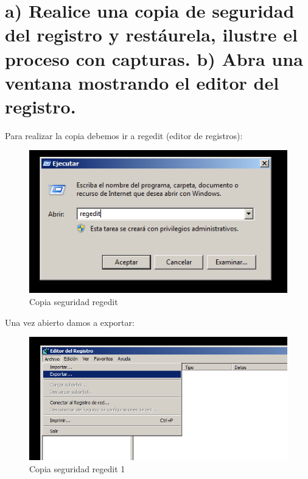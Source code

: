 \section[Cuestión 3]{a) Realice una copia de seguridad del registro y restáurela, ilustre el proceso con capturas. b) Abra una ventana mostrando el editor del	registro.}

Para realizar la copia debemos ir a regedit (editor de registros):

\begin{figure}[H] %
	\centering
	\includegraphics[scale=0.5]{pics/reg}  %
	\caption{Copia seguridad regedit} \label{fig:reg}
\end{figure}

Una vez abierto damos a exportar:

\begin{figure}[H] %
	\centering
	\includegraphics[scale=0.5]{pics/reg1}  %
	\caption{Copia seguridad regedit 1} \label{fig:reg1}
\end{figure}

